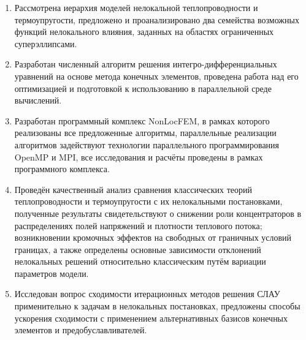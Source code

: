 \begin{enumerate}
	\item Рассмотрена иерархия моделей нелокальной теплопроводности и термоупругости, предложено и проанализировано два семейства возможных функций нелокального влияния, заданных на областях ограниченных суперэллипсами.
	
	\item Разработан численный алгоритм решения интегро-дифференциальных уравнений на основе метода конечных элементов, проведена работа над его оптимизацией и подготовкой к использованию в параллельной среде вычислений.
	
	\item Разработан программный комплекс NonLocFEM, в рамках которого реализованы все предложенные алгоритмы, параллельные реализации алгоритмов задействуют технологии параллельного программирования OpenMP и MPI, все исследования и расчёты проведены в рамках программного комплекса.
	
	\item Проведён качественный анализ сравнения классических теорий теплопроводности и термоупругости с их нелокальными постановками, полученные результаты свидетельствуют о снижении роли концентраторов в распределениях полей напряжений и плотности теплового потока; возникновении кромочных эффектов на свободных от граничных условий границах, а также определены основные зависимости отклонений нелокальных решений относительно классическим путём вариации параметров модели.
	
	\item Исследован вопрос сходимости итерационных методов решения СЛАУ применительно к задачам в нелокальных постановках, предложены способы ускорения сходимости с применением альтернативных базисов конечных элементов и предобуславливателей.
\end{enumerate}
